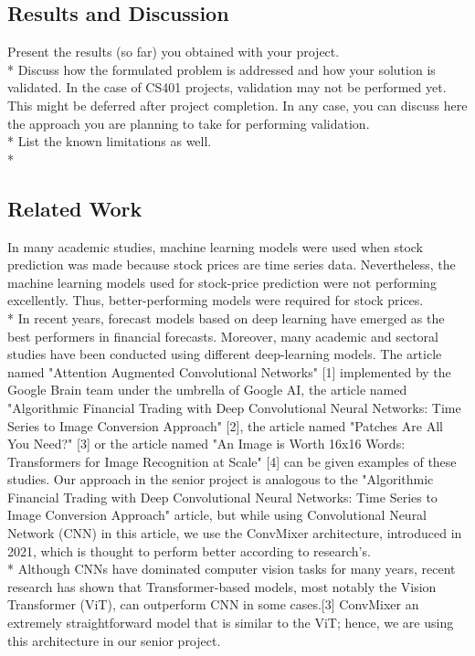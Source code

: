 \documentclass{article}
\begin{document}
\begin{center}
    \section{Results and Discussion}
\end{center}
Present the results (so far) you obtained with your project.\vspace{0.1cm} \\*
Discuss how the formulated problem is addressed and how your solution is validated. In the case of CS401 projects, validation may not be performed yet. This might be deferred after project completion. In any case, you can discuss here the approach you are planning to take for performing validation. \vspace{0.1cm} \\*
List the known limitations as well.\\*

\begin{center}
    \section{Related Work}
\end{center}
In many academic studies, machine learning models were used when stock prediction was made because stock prices are time series data. Nevertheless, the machine learning models used for stock-price prediction were not performing excellently. Thus, better-performing models were required for stock prices.\vspace{0.2cm} \\*
In recent years, forecast models based on deep learning have emerged as the best performers in financial forecasts. Moreover, many academic and sectoral studies have been conducted using different deep-learning models. The article named "Attention Augmented Convolutional Networks" [1] implemented by the Google Brain team under the umbrella of Google AI, the article named "Algorithmic Financial Trading with Deep Convolutional Neural Networks: Time Series to Image Conversion Approach" [2], the article named "Patches Are All You Need?" [3] or the article named "An Image is Worth 16x16 Words: Transformers for Image Recognition at Scale" [4] can be given examples of these studies. Our approach in the senior project is analogous to the "Algorithmic Financial Trading with Deep Convolutional Neural Networks: Time Series to Image Conversion Approach" article, but while using Convolutional Neural Network (CNN) in this article, we use the ConvMixer architecture, introduced in 2021, which is thought to perform better according to research's.\vspace{0.2cm} \\*
Although CNNs have dominated computer vision tasks for many years, recent research has shown that Transformer-based models, most notably the Vision Transformer (ViT), can outperform CNN in some cases.[3] ConvMixer an extremely straightforward model that is similar to the ViT; hence, we are using this architecture in our senior project.
\end{document}
